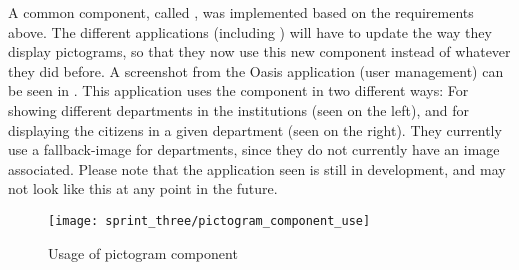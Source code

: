 A common component, called , was implemented based on the requirements above. The different applications (including \ct) will have to update the way they display pictograms, so that they now use this new component instead of whatever they did before. A screenshot from the Oasis application (user management) can be seen in . This application uses the component in two different ways: For showing different departments in the institutions (seen on the left), and for displaying the citizens in a given department (seen on the right). They currently use a fallback-image for departments, since they do not currently have an image associated. Please note that the application seen is still in development, and may not look like this at any point in the future. 

\begin{figure}[!htbp]
	\centering
	\texttt{[image: sprint\_three/pictogram\_component\_use]}
	\caption{Usage of pictogram component}
	\label{fig:pictogram_component_use}
\end{figure}